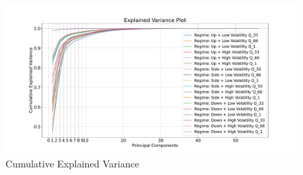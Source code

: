 \begin{figure}[H]
    \centering
    \includegraphics[width=\textwidth]{images/eda/explained_variance}
    \caption{Cumulative Explained Variance}
    \label{fig:explained-variance}
\end{figure}
